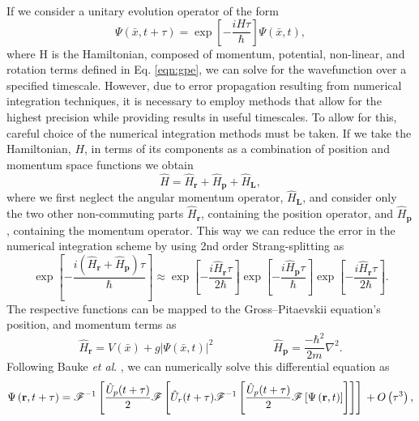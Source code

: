 If we consider a unitary evolution operator of the form
\begin{equation}\label{eqn:1}
\Psi(\bar{x},t+\tau) = \exp\left[ -\frac{iH\tau}{\hbar}\right]\Psi(\bar{x},t),
\end{equation}
where H is the Hamiltonian, composed of momentum, potential, non-linear, and rotation terms defined in Eq. \eqref{eqn:gpe}, we can solve for
the wavefunction over a specified timescale. However, due to error propagation resulting from numerical integration techniques, it is necessary to
employ methods that allow for the highest precision while providing results in useful timescales. To allow for this, careful choice of the numerical integration methods must be taken.  If we take the Hamiltonian, $H$, in terms of its components as a combination of position and momentum space functions we obtain
\begin{equation}\label{eqn:2}
\hat{H} = \hat{H}_{\textbf{r}} + \hat{H}_{\textbf{p}} + \hat{H}_{\textbf{L}},
\end{equation}
where we first neglect the angular momentum operator, $\hat{H}_{\textbf{L}}$, and consider only the two other non-commuting parts $\hat{H}_{\textbf{r}}$, containing the position operator, and $\hat{H}_{\textbf{p}}$, containing the momentum operator. This way we can reduce
the error in the numerical integration scheme by using 2nd order Strang-splitting as
\begin{equation}\label{eqn:3}
\exp\left[ -\frac{ i\left(\hat{H}_{\textbf{r}} + \hat{H}_{\textbf{p}}\right)\tau}{\hbar} \right] \approx \exp\left[- \frac{i\hat{H}_{\textbf{r}}\tau}{2\hbar} \right]\exp\left[-\frac{i\hat{H}_{\textbf{p}}\tau}{\hbar}\right]\exp\left[ -\frac{i\hat{H}_{\textbf{r}}\tau}{2\hbar}\right].
\end{equation}
The respective functions can be mapped to the Gross--Pitaevskii equation's position, and momentum terms as
\begin{equation}
\hat{H}_{\textbf{r}} = V(\bar{x}) + g\vert\Psi(\bar{x},t)\vert^2\; \hspace{5em} \hat{H}_{\textbf{p}} = \frac{-\hbar^2}{2m}\nabla^2.
\end{equation}
Following Bauke \textit{et al}. \cite{Num:Bauke_cpc_2011}, we can numerically solve this differential equation as
\begin{equation}
\Psi\left(\textbf{r},t+\tau\right) = \mathscr{F}^{-1} \left[\frac{\hat{U}_{p}(t+\tau)}{2} \mathscr{F} \left[ \hat{U}_{r}(t+\tau) \mathscr{F}^{-1} \left[ \frac{\hat{U}_{p}(t+\tau)}{2} \mathscr{F} \left[ \Psi\left(\textbf{r},t\right) \right] \right] \right] \right]  \\ + O\left(\tau^3\right),
\end{equation}
